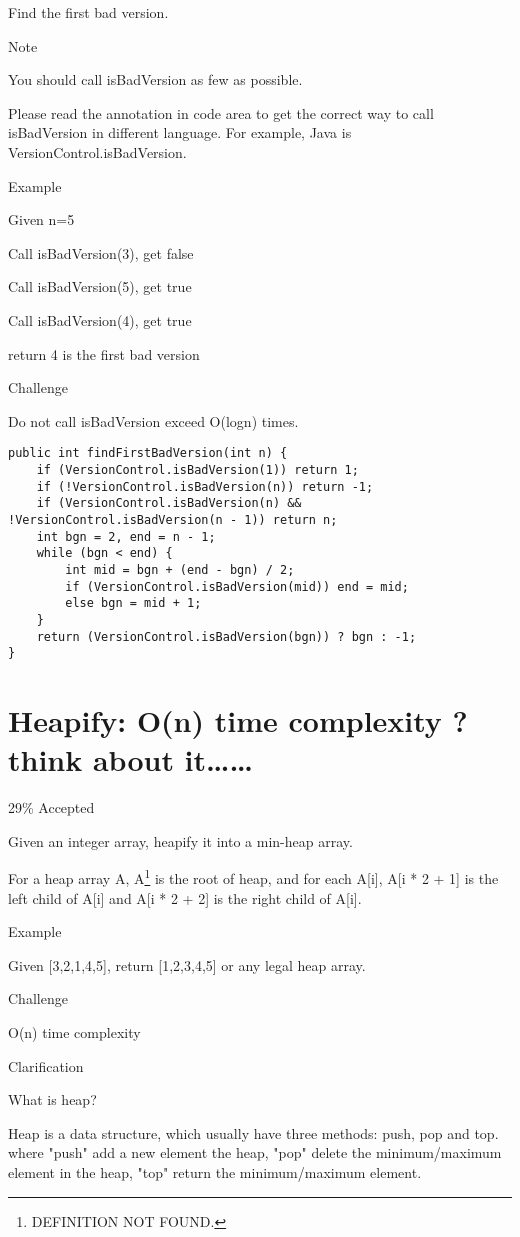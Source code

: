 \documentclass[12pt]{book}
\begin{document}
Find the first bad version.

Note

You should call isBadVersion as few as possible. 

Please read the annotation in code area to get the correct way to call isBadVersion in different language. For example, Java is VersionControl.isBadVersion.

Example

Given n=5

Call isBadVersion(3), get false

Call isBadVersion(5), get true

Call isBadVersion(4), get true

return 4 is the first bad version

Challenge

Do not call isBadVersion exceed O(logn) times.
\lstset{language=java,label= ,caption= ,numbers=none}
\begin{lstlisting}
public int findFirstBadVersion(int n) {
    if (VersionControl.isBadVersion(1)) return 1;
    if (!VersionControl.isBadVersion(n)) return -1;
    if (VersionControl.isBadVersion(n) && !VersionControl.isBadVersion(n - 1)) return n;
    int bgn = 2, end = n - 1;
    while (bgn < end) {
        int mid = bgn + (end - bgn) / 2;
        if (VersionControl.isBadVersion(mid)) end = mid;
        else bgn = mid + 1;
    }
    return (VersionControl.isBadVersion(bgn)) ? bgn : -1;
}
\end{lstlisting}
\chapter{Heapify: O(n) time complexity ? think about it\ldots{}\ldots{}}
\label{sec-30}

29\% Accepted

Given an integer array, heapify it into a min-heap array.

For a heap array A, A\footnote{DEFINITION NOT FOUND.} is the root of heap, and for each A[i], A[i * 2 + 1] is the left child of A[i] and A[i * 2 + 2] is the right child of A[i].

Example

Given [3,2,1,4,5], return [1,2,3,4,5] or any legal heap array.

Challenge

O(n) time complexity

Clarification

What is heap?

Heap is a data structure, which usually have three methods: push, pop and top. where "push" add a new element the heap, "pop" delete the minimum/maximum element in the heap, "top" return the minimum/maximum element.
\end{document}
